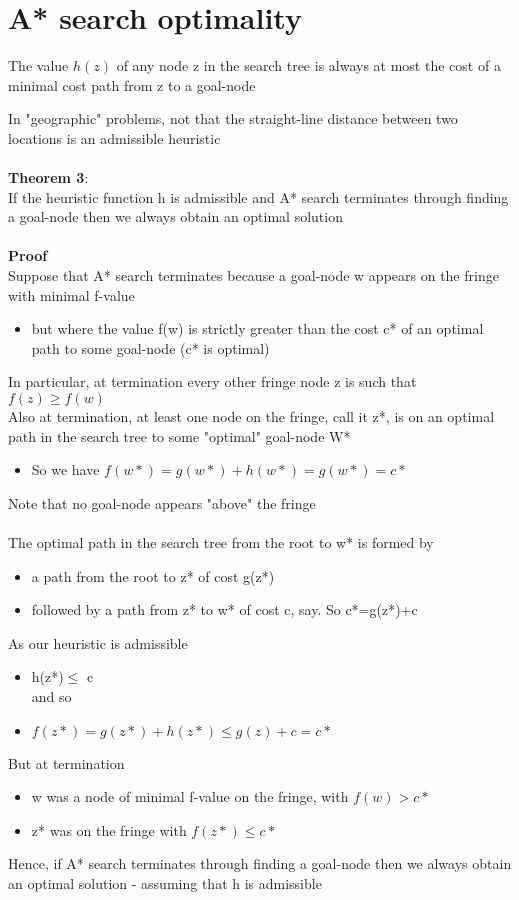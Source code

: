 \documentclass{article}[18pt]
\begin{document}
\section{A* search optimality}
\begin{defin}
The value $h(z)$ of any node z in the search tree is always at most the cost of a minimal cost path from z to a goal-node
\end{defin}
In "geographic" problems, not that the straight-line distance between two locations is an admissible heuristic\\
\\
\textbf{Theorem 3}:\\
If the heuristic function h is admissible and A* search terminates through finding a goal-node then we always obtain an optimal solution\\
\\
\textbf{Proof}\\
Suppose that A* search terminates because a goal-node w appears on the fringe with minimal f-value
\begin{itemize}
	\item but where the value f(w) is strictly greater than the cost c* of an optimal path to some goal-node (c* is optimal)
\end{itemize}
In particular, at termination every other fringe node z is such that $f(z)\geqslant f(w)$\\
Also at termination, at least one node on the fringe, call it z*, is on an optimal path in the search tree to some "optimal" goal-node W*
\begin{itemize}
	\item So we have $f(w*)=g(w*)+h(w*)=g(w*)=c*$
\end{itemize}
Note that no goal-node appears "above" the fringe\\
\\
The optimal path in the search tree from the root to w* is formed by
\begin{itemize}
	\item a path from the root to z* of cost g(z*)
	\item followed by a path from z* to w* of cost c, say. So c*=g(z*)+c
\end{itemize}
As our heuristic is admissible
\begin{itemize}
	\item h(z*)$\leqslant$ c\\
	and so
	\item $f(z*)=g(z*)+h(z*)\leqslant g(z) +c =c*$
\end{itemize}
But at termination
\begin{itemize}
	\item w was a node of minimal f-value on the fringe, with $f(w)>c*$
	\item z* was on the fringe with $f(z*)\leqslant c*$
\end{itemize}
Hence, if A* search terminates through finding a goal-node then we always obtain an optimal solution - assuming that h is admissible
\end{document}
